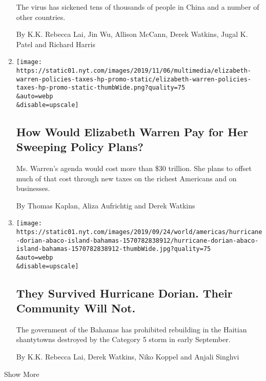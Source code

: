 \begin{enumerate}
  The virus has sickened tens of thousands of people in China and a
  number of other countries.

  By K.K. Rebecca Lai, Jin Wu, Allison McCann, Derek Watkins, Jugal K.
  Patel and Richard Harris
\item
  \href{/interactive/2019/11/06/us/politics/elizabeth-warren-policies-taxes.html}{}

  \texttt{[image: https://static01.nyt.com/images/2019/11/06/multimedia/elizabeth-warren-policies-taxes-hp-promo-static/elizabeth-warren-policies-taxes-hp-promo-static-thumbWide.png?quality=75\\\&auto=webp\\\&disable=upscale]}

  \hypertarget{how-would-elizabeth-warren-pay-for-her-sweeping-policy-plans}{%
  \subsection{How Would Elizabeth Warren Pay for Her Sweeping Policy
  Plans?}\label{how-would-elizabeth-warren-pay-for-her-sweeping-policy-plans}}

  Ms. Warren's agenda would cost more than \$30 trillion. She plans to
  offset much of that cost through new taxes on the richest Americans
  and on businesses.

  By Thomas Kaplan, Aliza Aufrichtig and Derek Watkins
\item
  \href{/interactive/2019/09/25/world/americas/hurricane-dorian-abaco-island-bahamas.html}{}

  \texttt{[image: https://static01.nyt.com/images/2019/09/24/world/americas/hurricane-dorian-abaco-island-bahamas-1570782838912/hurricane-dorian-abaco-island-bahamas-1570782838912-thumbWide.jpg?quality=75\\\&auto=webp\\\&disable=upscale]}

  \hypertarget{they-survived-hurricane-dorian-their-community-will-not}{%
  \subsection{They Survived Hurricane Dorian. Their Community Will
  Not.}\label{they-survived-hurricane-dorian-their-community-will-not}}

  The government of the Bahamas has prohibited rebuilding in the Haitian
  shantytowns destroyed by the Category 5 storm in early September.

  By K.K. Rebecca Lai, Derek Watkins, Niko Koppel and Anjali Singhvi
\end{enumerate}

Show More

